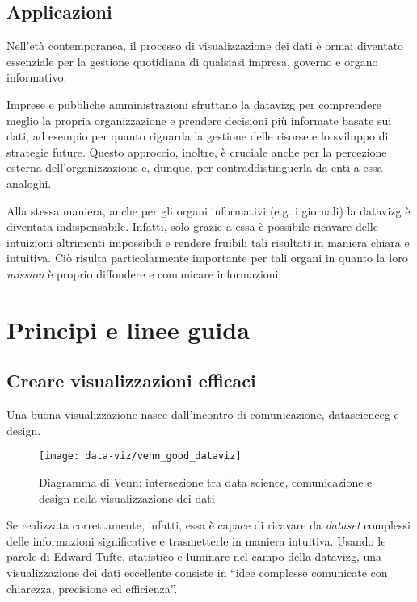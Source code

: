 \subsection{Applicazioni}
Nell'età contemporanea, il processo di visualizzazione dei dati è ormai diventato essenziale per la gestione quotidiana di qualsiasi 
impresa, governo e organo informativo.

Imprese e pubbliche amministrazioni sfruttano la \gls{datavizg} per comprendere meglio la propria organizzazione e 
prendere decisioni più informate basate sui dati, ad esempio per quanto riguarda la gestione delle risorse e lo sviluppo di strategie future. 
Questo approccio, inoltre, è cruciale anche per la percezione esterna dell'organizzazione e, dunque, per contraddistinguerla da enti a essa analoghi.

Alla stessa maniera, anche per gli organi informativi (e.g. i giornali) la \gls{datavizg} è diventata indispensabile. 
Infatti, solo grazie a essa è possibile ricavare delle intuizioni altrimenti impossibili e rendere fruibili 
tali risultati in maniera chiara e intuitiva. Ciò risulta particolarmente importante per tali organi in quanto la loro \emph{mission} è proprio diffondere 
e comunicare informazioni.



\section{Principi e linee guida}
\subsection{Creare visualizzazioni efficaci}
Una buona visualizzazione nasce dall'incontro di comunicazione, \gls{datascienceg} e design.
\begin{figure}[!h] 
    \centering 
    \texttt{[image: data-viz/venn\_good\_dataviz]} 
    \caption{Diagramma di Venn: intersezione tra data science, comunicazione e design nella visualizzazione dei dati}
    \label{fig:venn_good_dataviz}
\end{figure}

\noindent Se realizzata correttamente, infatti, essa è capace di ricavare da \emph{dataset} complessi delle informazioni significative e trasmetterle in maniera intuitiva.
Usando le parole di Edward Tufte, statistico e luminare nel campo della \gls{datavizg}, una visualizzazione dei dati eccellente consiste in
``idee complesse comunicate con chiarezza, precisione ed efficienza''.

